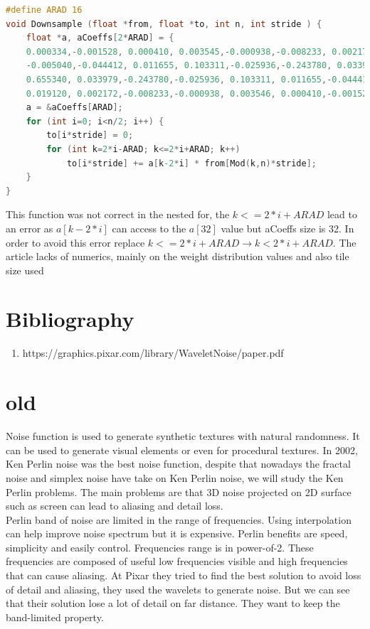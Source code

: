 \documentclass[11pt,a4paper]{article}
\begin{document}
\begin{lstlisting}[language=C]
#define ARAD 16
void Downsample (float *from, float *to, int n, int stride ) {
	float *a, aCoeffs[2*ARAD] = {
	0.000334,-0.001528, 0.000410, 0.003545,-0.000938,-0.008233, 0.002172, 		0.019120,
	-0.005040,-0.044412, 0.011655, 0.103311,-0.025936,-0.243780, 0.033979, 	0.655340,
	0.655340, 0.033979,-0.243780,-0.025936, 0.103311, 0.011655,-0.044412,-0.005040,
	0.019120, 0.002172,-0.008233,-0.000938, 0.003546, 0.000410,-0.001528, 	0.000334};
	a = &aCoeffs[ARAD];
	for (int i=0; i<n/2; i++) {
		to[i*stride] = 0;
		for (int k=2*i-ARAD; k<=2*i+ARAD; k++)
			to[i*stride] += a[k-2*i] * from[Mod(k,n)*stride];
	}
}
\end{lstlisting}
This function was not correct in the nested for, the $k<=2*i+ARAD$ lead to an error as $a[k-2*i]$ can access to the $a[32]$ value but aCoeffs size is 32. In order to avoid this error replace $k<=2*i+ARAD \rightarrow k<2*i+ARAD$.
The article lacks of numerics, mainly on the weight distribution values and also tile size used
\section{Bibliography}

\begin{enumerate}
\item https://graphics.pixar.com/library/WaveletNoise/paper.pdf
\end{enumerate}

\section{old}
Noise function is used to generate synthetic textures with natural randomness. It can be used to generate visual elements or even for procedural textures. In 2002, Ken Perlin noise was the best noise function, despite that nowadays the fractal noise and simplex noise have take on Ken Perlin noise, we will study the Ken Perlin problems. The main problems are that 3D noise projected on 2D surface such as screen can lead to aliasing and detail loss.
\\
Perlin band of noise are limited in the range of frequencies. Using interpolation can help improve noise spectrum but it is expensive.
Perlin benefits are speed, simplicity and easily control. Frequencies range is in power-of-2. These frequencies are composed of useful low frequencies visible and high frequencies that can cause aliasing.
At Pixar they tried to find the best solution to avoid loss of detail and aliasing, they used the wavelets to generate noise. But we can see that their solution lose a lot of detail on far distance. They want to keep the band-limited property.
\\\\
\end{document}
